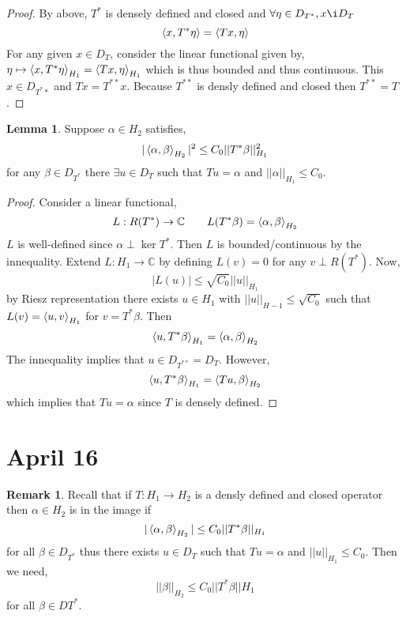 \documentclass[12pt]{extarticle}
\newcommand{\C}{\mathbb{C}}
\theoremstyle{definition}
\newtheorem{lemma}[theorem]{Lemma}
\newtheorem{remark}{Remark}
\begin{document}
\begin{proof}
By above, $T^*$ is densely defined and closed and $\forall \eta \in D_{T^*}, x \i D_T$
\[ \left< x, T^* \eta \right> = \left< Tx, \eta \right> \]
For any given $x \in D_T$, consider the linear functional given by, $\eta \mapsto \left< x, T^* \eta \right>_{H_1} = \left< Tx, \eta \right>_{H_1}$ which is thus bounded and thus continuous. This $x \in D_{T^**}$ and $Tx = T^{**} x$. Because $T^{**}$ is densly defined and closed then $T^{**} = T$. 
\end{proof}

\begin{lemma}
Suppose $\alpha \in H_2$ satisfies,
\[ | \left< \alpha, \beta \right>_{H_2} |^2 \le C_0 || T^* \beta ||_{H_1}^2 \]
for any $\beta \in D_{T^*}$ there $\exists u \in D_T$ such that $T u = \alpha$ and $|| \alpha ||_{H_1} \le C_0$.
\end{lemma}

\begin{proof}
Consider a linear functional,
\[ L : R(T^*) \to \C \quad \quad L(T^* \beta) = \inner{\alpha}{\beta}_{H_2} \]
$L$ is well-defined since $\alpha \perp \ker{T^*}$. Then $L$ is bounded/continuous by the innequality. Extend $L : H_1 \to \C$ by defining $L(v) = 0$ for any $v \perp R(T^*)$. Now,
\[ |L(u)| \le \sqrt{C_0} || u ||_{H_1} \]
by Riesz representation there exists $u \in H_1$ with $|| u ||_{H-1} \le \sqrt{C_0}$ such that $L(v) = \left< u, v \right>_{H_1}$ for $v = T^* \beta$. Then 
\[ \left< u, T^*\beta \right>_{H_1} = \left< \alpha, \beta \right>_{H_2} \]
The innequality implies that $u \in D_{T^{**}} = D_T$. However,
\[ \left< u, T^* \beta \right>_{H_1} = \left< Tu, \beta \right>_{H_2} \]
which implies that $Tu = \alpha$ since $T$ is densely defined. 
\end{proof}


\section{April 16}

\begin{remark}
Recall that if $T : H_1 \to H_2$ is a densly defined and closed operator then $\alpha \in H_2$ is in the image if 
\[ | \left< \alpha, \beta \right>_{H_2} | \le C_0 || T^* \beta ||_{H_1} \]
for all $\beta \in D_{T^*}$ thus there exists $u \in D_T$ such that $Tu = \alpha$ and $|| u ||_{H_1} \le C_0$. Then we need,
\[ || \beta ||_{H_2} \le C_0 || T^* \beta ||{H_1} \]
for all $\beta \in D{T^*}$. 
\end{remark}
\end{document}
